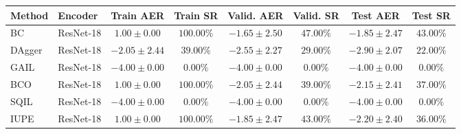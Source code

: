 \begin{table}[ht]
\centering
\scriptsize
\begin{tabular*}{\textwidth}{@{\extracolsep{\fill}}llcccccc}
\toprule
Method & Encoder & Train AER & Train SR & Valid. AER & Valid. SR & Test AER & Test SR \\
\midrule
BC & ResNet-18 & $1.00 \pm 0.00$ & $100.00\%$ & $-1.65 \pm 2.50$ & $47.00\%$ & $-1.85 \pm 2.47$ & $43.00\%$ \\
\midrule
DAgger & ResNet-18 & $-2.05 \pm 2.44$ & $39.00\%$ & $-2.55 \pm 2.27$ & $29.00\%$ & $-2.90 \pm 2.07$ & $22.00\%$ \\
\midrule
GAIL & ResNet-18 & $-4.00 \pm 0.00$ & $0.00\%$ & $-4.00 \pm 0.00$ & $0.00\%$ & $-4.00 \pm 0.00$ & $0.00\%$ \\
\midrule
BCO & ResNet-18 & $1.00 \pm 0.00$ & $100.00\%$ & $-2.05 \pm 2.44$ & $39.00\%$ & $-2.15 \pm 2.41$ & $37.00\%$ \\
\midrule
SQIL & ResNet-18 & $-4.00 \pm 0.00$ & $0.00\%$ & $-4.00 \pm 0.00$ & $0.00\%$ & $-4.00 \pm 0.00$ & $0.00\%$ \\
\midrule
IUPE & ResNet-18 & $1.00 \pm 0.00$ & $100.00\%$ & $-1.85 \pm 2.47$ & $43.00\%$ & $-2.20 \pm 2.40$ & $36.00\%$ \\
\bottomrule
\end{tabular*}
\end{table}
